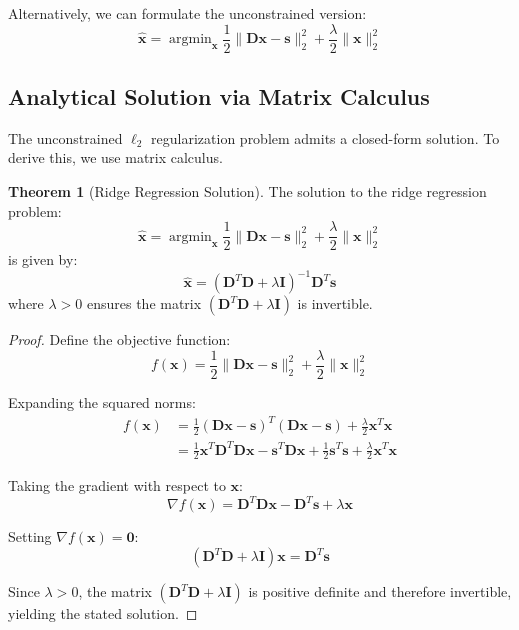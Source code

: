 \documentclass[12pt]{article}
\renewcommand{\vec}[1]{\mathbf{#1}}
\DeclareMathOperator{\argmin}{argmin}
\theoremstyle{definition}
\newtheorem{theorem}{Theorem}[section]
\begin{document}
Alternatively, we can formulate the unconstrained version:
\begin{equation}
    \hat{\vec{x}} = \argmin_{\vec{x}} \frac{1}{2}\|\mathbf{D}\vec{x} - \vec{s}\|_2^2 + \frac{\lambda}{2}\|\vec{x}\|_2^2
\end{equation}

\subsection{Analytical Solution via Matrix Calculus}

The unconstrained $\ell_2$ regularization problem admits a closed-form solution. To derive this, we use matrix calculus.

\begin{theorem}[Ridge Regression Solution]
    \label{thm:ridge}
    The solution to the ridge regression problem:
    \begin{equation}
        \hat{\vec{x}} = \argmin_{\vec{x}} \frac{1}{2}\|\mathbf{D}\vec{x} - \vec{s}\|_2^2 + \frac{\lambda}{2}\|\vec{x}\|_2^2
    \end{equation}
    is given by:
    \begin{equation}
        \hat{\vec{x}} = (\mathbf{D}^T\mathbf{D} + \lambda \mathbf{I})^{-1} \mathbf{D}^T \vec{s}
    \end{equation}
    where $\lambda > 0$ ensures the matrix $(\mathbf{D}^T\mathbf{D} + \lambda \mathbf{I})$ is invertible.
\end{theorem}

\begin{proof}
    Define the objective function:
    \begin{equation}
        f(\vec{x}) = \frac{1}{2}\|\mathbf{D}\vec{x} - \vec{s}\|_2^2 + \frac{\lambda}{2}\|\vec{x}\|_2^2
    \end{equation}

    Expanding the squared norms:
    \begin{align}
        f(\vec{x}) & = \frac{1}{2}(\mathbf{D}\vec{x} - \vec{s})^T(\mathbf{D}\vec{x} - \vec{s}) + \frac{\lambda}{2}\vec{x}^T\vec{x}                                      \\
                   & = \frac{1}{2}\vec{x}^T\mathbf{D}^T\mathbf{D}\vec{x} - \vec{s}^T\mathbf{D}\vec{x} + \frac{1}{2}\vec{s}^T\vec{s} + \frac{\lambda}{2}\vec{x}^T\vec{x}
    \end{align}

    Taking the gradient with respect to $\vec{x}$:
    \begin{equation}
        \nabla f(\vec{x}) = \mathbf{D}^T\mathbf{D}\vec{x} - \mathbf{D}^T\vec{s} + \lambda\vec{x}
    \end{equation}

    Setting $\nabla f(\vec{x}) = \vec{0}$:
    \begin{equation}
        (\mathbf{D}^T\mathbf{D} + \lambda \mathbf{I})\vec{x} = \mathbf{D}^T\vec{s}
    \end{equation}

    Since $\lambda > 0$, the matrix $(\mathbf{D}^T\mathbf{D} + \lambda \mathbf{I})$ is positive definite and therefore invertible, yielding the stated solution.
\end{proof}
\end{document}
